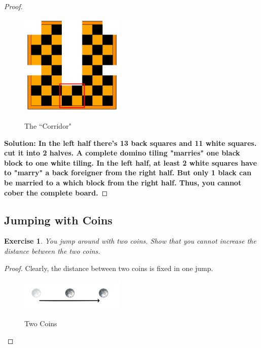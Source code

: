 \documentclass[12pt,a4]{article}
\theoremstyle{exercise}
\newtheorem{exercise}[theorem]{Exercise}
\begin{document}
\begin{proof}

    \begin{figure}[h]
        \small
        \centering
        \includegraphics[width=5cm]{corridor.png}
        \label{fig:corridor}
        \caption{The ``Corridor"}
    \end{figure}


    \textbf{Solution: In the left half there's 13 back squares and 11 white squares.
    cut it into 2 halves. A complete domino tiling "marries" one black block to one white tiling. In the left half, at least 2 white squares have to "marry" a back foreigner from the right half. But only 1 black can be married to a which block from the right half. Thus, you cannot cober the complete board. }


\end{proof}




\subsection{Jumping with Coins}

\begin{exercise}
    You jump around with two coins.
    Show that you cannot increase the distance between the two coins.
\end{exercise}

\begin{proof}
    Clearly, the distance between two coins is fixed in one jump.

    \begin{figure}[H]
        \small
        \centering
        \includegraphics[width=5cm]{twocoins.png}
        \label{fig:twoCoins}
        \caption{Two Coins}
    \end{figure}

\end{proof}
\end{document}
